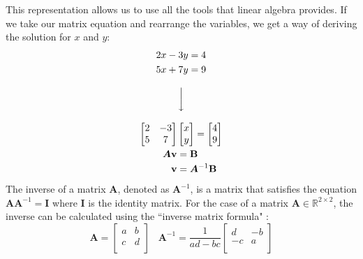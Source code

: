 \documentclass[a4paper,12pt]{article}
\newcommand{\matrx}[1]{\bm{#1}}
\newcommand{\vectr}[1]{\textbf{#1}}
\newcommand{\real}{\mathbb{R}}
\begin{document}
	This representation allows us to use all the tools that linear algebra provides. If we take our matrix equation and rearrange the variables, we get a way of deriving the solution for $ x $ and $ y $:
	\begin{equation}
		\begin{array}{c}
			\begin{aligned}
				2x - 3y &= 4 \\
				5x + 7y &= 9
			\end{aligned}
			\\ \\
			\bigg\downarrow\vcenter{ }
			\\ \\
			\begin{aligned}
				\begin{bmatrix}
					2 & -3 \\
					5 & 7 
				\end{bmatrix}&
				\begin{bmatrix}
					x \\
					y
				\end{bmatrix}
				=
				\begin{bmatrix}
					4 \\
					9
				\end{bmatrix} \\
				\matrx{A} \vectr{v} &= \vectr{B} \\
				\vectr{v} &= \matrx{A}^{-1} \vectr{B}
			\end{aligned}
		\end{array}
	\end{equation}
	The inverse of a matrix $ \matrx{A} $, denoted as $ \matrx{A}^{-1} $, is a matrix that satisfies the equation $ \matrx{A} \matrx{A}^{-1} = \matrx{I} $ where $ \matrx{I} $ is the identity matrix. For the case of a matrix $ \matrx{A} \in \real^{2 \times 2} $, the inverse can be calculated using the ``inverse matrix formula" \cite{def_inv_2x2_det}: 
	\begin{equation}
		\matrx{A} = \begin{bmatrix}
			a & b \\
			c & d \\
		\end{bmatrix}
		\hspace{10pt}
		\matrx{A}^{-1} = \frac{1}{ad-bc} \begin{bmatrix}
			d & -b \\
			-c & a \\
		\end{bmatrix}
		\label{eq:2_2_inv}
	\end{equation}
\end{document}
